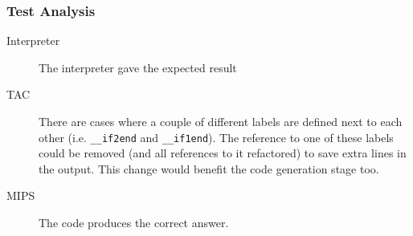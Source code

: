 \subsubsection{Test Analysis}
\begin{description}
	\item[Interpreter] The interpreter gave the expected result
	\item[TAC] There are cases where a couple of different labels are defined next to each other (i.e. \verb!__if2end! and \verb!__if1end!). The reference to one of these labels could be removed (and all references to it refactored) to save extra lines in the output. This change would benefit the code generation stage too.
	\item[MIPS] The code produces the correct answer.
\end{description}
